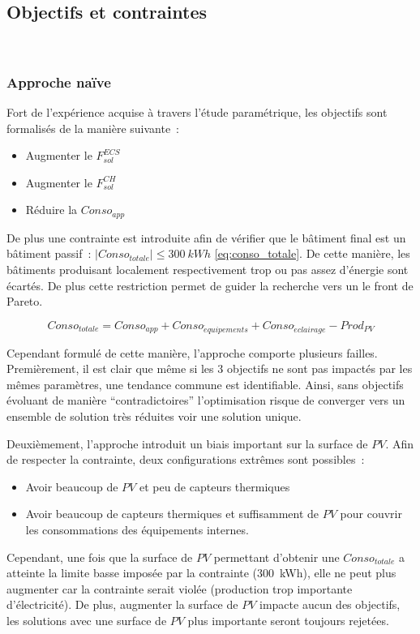 \subsection{Objectifs et contraintes} %
\label{sub:objectifs_et_contraintes}
~

\subsubsection{Approche naïve} %
\label{ssub:approche_naive}
Fort de l’expérience acquise à travers l’étude paramétrique, les objectifs sont formalisés
de la manière suivante~:
\begin{itemize}
  \item Augmenter le $F_{sol}^{ECS}$
  \item Augmenter le $F_{sol}^{CH}$
  \item Réduire la $Conso_{app}$
\end{itemize}
De plus une contrainte est introduite afin de vérifier que le bâtiment final
est un bâtiment passif~: $|Conso_{totale}| \leq \SI{300}{kWh}$ \eqref{eq:conso_totale}.
De cette manière, les bâtiments produisant localement respectivement trop ou pas assez d’énergie sont
écartés. De plus cette restriction permet de guider la recherche vers un le front de
Pareto.

\begin{equation} \label{eq:conso_totale}
  Conso_{totale} = Conso_{app} + Conso_{\acute equipements} + Conso_{\acute eclairage} - Prod_{PV}
\end{equation}

Cependant formulé de cette manière, l’approche comporte plusieurs failles. Premièrement,
il est clair que même si les \num{3} objectifs ne sont pas impactés par les mêmes
paramètres, une tendance commune est identifiable. Ainsi, sans objectifs évoluant de
manière \enquote{contradictoires} l’optimisation risque de converger vers un ensemble
de solution très réduites voir une solution unique.

Deuxièmement, l’approche introduit un biais important sur la surface de $PV$. Afin de
respecter la contrainte, deux configurations extrêmes sont possibles~:
\begin{itemize}
  \item Avoir beaucoup de $PV$ et peu de capteurs thermiques
  \item Avoir beaucoup de capteurs thermiques et suffisamment de $PV$ pour couvrir
        les consommations des équipements internes.
\end{itemize}
Cependant, une fois que la surface de $PV$ permettant d’obtenir une $Conso_{totale}$
a atteinte la limite basse imposée par la contrainte (\SI{300}{kWh}), elle ne peut plus
augmenter car la contrainte serait violée (production trop importante d’électricité). De plus,
augmenter la surface de $PV$ impacte aucun des objectifs, les solutions avec une surface
de $PV$ plus importante seront toujours rejetées.

